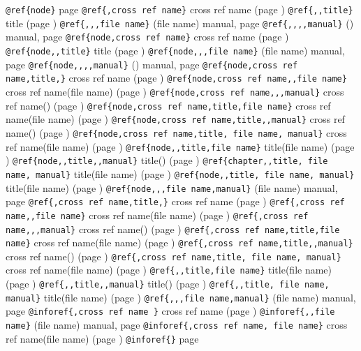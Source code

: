\documentclass{book}
\begin{document}
\texttt{@ref\{node\}} page \pageref{anchor:node}
\texttt{@ref\{,cross ref name\}} cross ref name (page \pageref{anchor:})
\texttt{@ref\{,,title\}} title (page \pageref{anchor:})
\texttt{@ref\{,,,file name\}} (file name) manual, page \pageref{anchor:}
\texttt{@ref\{,,,,manual\}} () manual, page \pageref{anchor:}
\texttt{@ref\{node,cross ref name\}} cross ref name (page \pageref{anchor:node})
\texttt{@ref\{node,,title\}} title (page \pageref{anchor:node})
\texttt{@ref\{node,,,file name\}} (file name) manual, page \pageref{anchor:node}
\texttt{@ref\{node,,,,manual\}} () manual, page \pageref{anchor:node}
\texttt{@ref\{node,cross ref name,title,\}} cross ref name (page \pageref{anchor:node})
\texttt{@ref\{node,cross ref name,,file name\}} cross ref name(file name) (page \pageref{anchor:node})
\texttt{@ref\{node,cross ref name,,,manual\}} cross ref name() (page \pageref{anchor:node})
\texttt{@ref\{node,cross ref name,title,file name\}} cross ref name(file name) (page \pageref{anchor:node})
\texttt{@ref\{node,cross ref name,title,,manual\}} cross ref name() (page \pageref{anchor:node})
\texttt{@ref\{node,cross ref name,title, file name, manual\}} cross ref name(file name) (page \pageref{anchor:node})
\texttt{@ref\{node,,title,file name\}} title(file name) (page \pageref{anchor:node})
\texttt{@ref\{node,,title,,manual\}} title() (page \pageref{anchor:node})
\texttt{@ref\{chapter,,title, file name, manual\}} title(file name) (page \pageref{anchor:chapter})
\texttt{@ref\{node,,title, file name, manual\}} title(file name) (page \pageref{anchor:node})
\texttt{@ref\{node,,,file name,manual\}} (file name) manual, page \pageref{anchor:node}
\texttt{@ref\{,cross ref name,title,\}} cross ref name (page \pageref{anchor:})
\texttt{@ref\{,cross ref name,,file name\}} cross ref name(file name) (page \pageref{anchor:})
\texttt{@ref\{,cross ref name,,,manual\}} cross ref name() (page \pageref{anchor:})
\texttt{@ref\{,cross ref name,title,file name\}} cross ref name(file name) (page \pageref{anchor:})
\texttt{@ref\{,cross ref name,title,,manual\}} cross ref name() (page \pageref{anchor:})
\texttt{@ref\{,cross ref name,title, file name, manual\}} cross ref name(file name) (page \pageref{anchor:})
\texttt{@ref\{,,title,file name\}} title(file name) (page \pageref{anchor:})
\texttt{@ref\{,,title,,manual\}} title() (page \pageref{anchor:})
\texttt{@ref\{,,title, file name, manual\}} title(file name) (page \pageref{anchor:})
\texttt{@ref\{,,,file name,manual\}} (file name) manual, page \pageref{anchor:}
\texttt{@inforef\{,cross ref name \}} cross ref name (page \pageref{anchor:})
\texttt{@inforef\{,,file name\}} (file name) manual, page \pageref{anchor:}
\texttt{@inforef\{,cross ref name, file name\}} cross ref name(file name) (page \pageref{anchor:})
\texttt{@inforef\{\}} page \pageref{anchor:}
\end{document}
